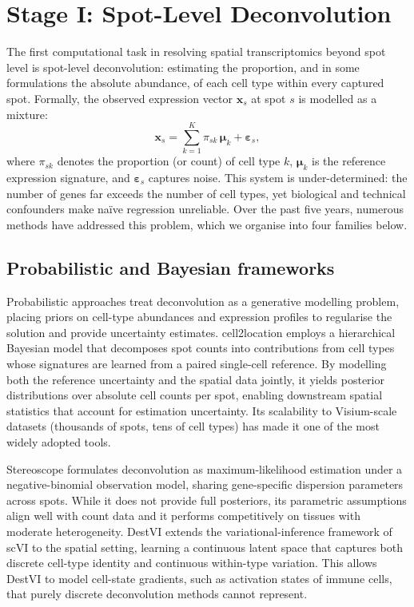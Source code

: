 \section{Stage I: Spot-Level Deconvolution}
\label{sec:stage1}

The first computational task in resolving spatial transcriptomics beyond spot level is spot-level deconvolution: estimating the proportion, and in some formulations the absolute abundance, of each cell type within every captured spot. Formally, the observed expression vector $\mathbf{x}_s$ at spot $s$ is modelled as a mixture:
\begin{equation}
  \mathbf{x}_s = \sum_{k=1}^{K} \pi_{sk}\,\boldsymbol{\mu}_k + \boldsymbol{\varepsilon}_s,
  \label{eq:deconv}
\end{equation}
where $\pi_{sk}$ denotes the proportion (or count) of cell type $k$, $\boldsymbol{\mu}_k$ is the reference expression signature, and $\boldsymbol{\varepsilon}_s$ captures noise. This system is under-determined: the number of genes far exceeds the number of cell types, yet biological and technical confounders make na\"ive regression unreliable. Over the past five years, numerous methods have addressed this problem, which we organise into four families below.

\subsection{Probabilistic and Bayesian frameworks}

Probabilistic approaches treat deconvolution as a generative modelling problem, placing priors on cell-type abundances and expression profiles to regularise the solution and provide uncertainty estimates. cell2location \citep{kleshchevnikov2022cell2location} employs a hierarchical Bayesian model that decomposes spot counts into contributions from cell types whose signatures are learned from a paired single-cell reference. By modelling both the reference uncertainty and the spatial data jointly, it yields posterior distributions over absolute cell counts per spot, enabling downstream spatial statistics that account for estimation uncertainty. Its scalability to Visium-scale datasets (thousands of spots, tens of cell types) has made it one of the most widely adopted tools.

Stereoscope \citep{andersson2020single} formulates deconvolution as maximum-likelihood estimation under a negative-binomial observation model, sharing gene-specific dispersion parameters across spots. While it does not provide full posteriors, its parametric assumptions align well with count data and it performs competitively on tissues with moderate heterogeneity. DestVI \citep{lopez2022destvi} extends the variational-inference framework of scVI to the spatial setting, learning a continuous latent space that captures both discrete cell-type identity and continuous within-type variation. This allows DestVI to model cell-state gradients, such as activation states of immune cells, that purely discrete deconvolution methods cannot represent.

